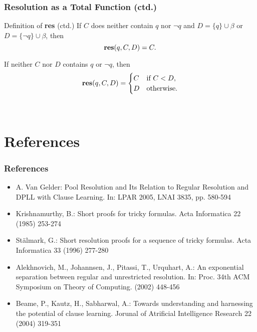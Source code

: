 \documentclass{beamer}
\theoremstyle{definition} \newtheorem{mdefinition}{Definition}
\theoremstyle{plain} \newtheorem{mtheorem}{Theorem}
\theoremstyle{plain} \newtheorem{mcorollary}{Corollary}
\theoremstyle{plain} \newtheorem{mfact}{Fact}
\begin{document}
\begin{frame}
	\frametitle{Resolution as a Total Function (ctd.)}
	\begin{block}{Definition of {\bf res} (ctd.)}
		If $C$ does neither contain $q$ nor $\neg q$ and $D = \{q\} \cup \beta$ or $D = \{\neg q\} \cup \beta$, then
		\begin{equation*}
			{\bf res}(q,C,D) = C.
		\end{equation*}
		
		If neither $C$ nor $D$ contains $q$ or $\neg q$, then
		\begin{equation*}
			{\bf res}(q,C,D) = 	\begin{cases}
														C		& \text{if } C < D,\\
														D		& \text{otherwise.}
													\end{cases}
		\end{equation*}
	\end{block}
\end{frame}










\
\section{References}

\begin{frame}
	\frametitle{References}

	\begin{itemize}
		\item	A. Van Gelder: Pool Resolution and Its Relation to Regular Resolution and DPLL with Clause Learning. In: LPAR 2005, LNAI 3835, pp. 580-594
		\item  Krishnamurthy, B.: Short proofs for tricky formulas. Acta Informatica 22 (1985) 253-274
		\item St\"almark, G.: Short resolution proofs for a sequence of tricky formulas. Acta Informatica 33 (1996) 277-280
		\item Alekhnovich, M., Johannsen, J., Pitassi, T., Urquhart, A.: An exponential separation between regular and unrestricted resolution. In: Proc. 34th ACM Symposium on Theory of Computing. (2002) 448-456
		\item Beame, P., Kautz, H., Sabharwal, A.: Towards understanding and harnessing the potential of clause learning. Jorunal of Atrificial Intelligence Research 22 (2004) 319-351
	\end{itemize}
\end{frame}

\end{document}

